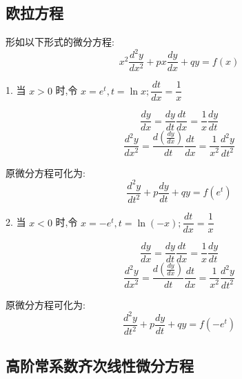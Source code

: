 \subsection{欧拉方程}
\begin{definition}[欧拉方程]\label{def: 欧拉方程}
	形如以下形式的微分方程:
	$$x^{2}\dfrac{d^{2}y}{dx^2}+px\dfrac{dy}{dx}+qy=f(x)$$

	1. 当 $x>0$ 时,令 $x=e^t,t=\ln x;\dfrac{dt}{dx}=\dfrac{1}{x}$

	$$\dfrac{dy}{dx}=\dfrac{dy}{dt}\dfrac{dt}{dx}=\dfrac{1}{x}\dfrac{dy}{dt}$$
	$$\dfrac{d^{2}y}{dx^2}=\dfrac{d(\frac{dy}{dx})}{dt}\dfrac{dt}{dx}=\dfrac{1}{x^2}\dfrac{d^{2}y}{dt^2}$$

	原微分方程可化为:
	$$\dfrac{d^{2}y}{dt^2}+p\dfrac{dy}{dt}+qy=f(e^t)$$

	2. 当 $x<0$ 时,令 $x=-e^t,t=\ln(-x);\dfrac{dt}{dx}=\dfrac{1}{x}$

	$$\dfrac{dy}{dx}=\dfrac{dy}{dt}\dfrac{dt}{dx}=\dfrac{1}{x}\dfrac{dy}{dt}$$
	$$\dfrac{d^{2}y}{dx^2}=\dfrac{d(\frac{dy}{dx})}{dt}\dfrac{dt}{dx}=\dfrac{1}{x^2}\dfrac{d^{2}y}{dt^2}$$

	原微分方程可化为:
	$$\dfrac{d^{2}y}{dt^2}+p\dfrac{dy}{dt}+qy=f(-e^t)$$
\end{definition}
\subsection{高阶常系数齐次线性微分方程}


